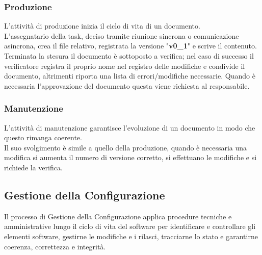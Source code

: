 \documentclass[a4paper,12pt]{article}
\begin{document}
        \subsubsection{Produzione}
            L'attività di produzione inizia il ciclo di vita di un documento.\\
            L'assegnatario della task, deciso tramite riunione sincrona o comunicazione asincrona, crea il file relativo, registrata la versione "\textbf{v0\_1}" e scrive il contenuto.
            Terminata la stesura il documento è sottoposto a verifica; nel caso di successo il verificatore registra il proprio nome nel registro delle modifiche e condivide il documento, altrimenti riporta una lista di errori/modifiche necessarie.
            Quando è necessaria l'approvazione del documento questa viene richiesta al responsabile.

        \subsubsection{Manutenzione}
            L'attività di manutenzione garantisce l'evoluzione di un documento in modo che questo rimanga coerente.\\
            Il suo svolgimento è simile a quello della produzione, quando è necessaria una modifica si aumenta il numero di versione corretto, si effettuano le modifiche e si richiede la verifica.

    \subsection{Gestione della Configurazione}
        Il processo di Gestione della Configurazione applica procedure tecniche e amministrative lungo il ciclo di vita del software per identificare e controllare gli elementi software, gestirne le modifiche e i rilasci, tracciarne lo stato e garantirne coerenza, correttezza e integrità.
\end{document}
